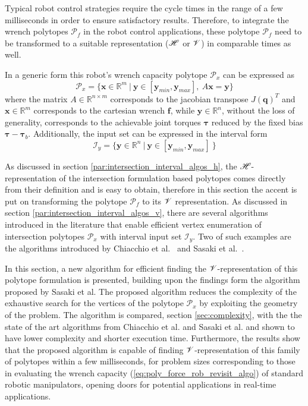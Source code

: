 Typical robot control strategies require the cycle times in the range of a few milliseconds in order to ensure satisfactory results. Therefore, to integrate the wrench polytopes $\mathcal{P}_f$ in the robot control applications, these polytope $\mathcal{P}_f$ need to be transformed to a suitable representation ($\mathscr{H}$ or $\mathscr{V}$) in comparable times as well.


In a generic form this robot's wrench capacity polytope $\mathcal{P}_x$ can be expressed as
\begin{equation}
    \mathcal{P}_x=\{\bm{x}\in\mathbb{R}^m~ |~\bm{y}\in[\bm{y}_{min}, \bm{y}_{max}], ~ A\bm{x} = \bm{y}\}
    \label{eq:inter_hyp_revisit_algo}
\end{equation}
where the matrix $A\in\mathbb{R}^{n\times m}$ corresponds to the jacobian transpose $J(\bm{q})^T$ and $\bm{x}\in\mathbb{R}^m$ corresponds to the cartesian wrench $\bm{f}$, while $\bm{y}\in\mathbb{R}^n$, without the loss of generality, corresponds to the achievable joint torques $\bm{\tau}$ reduced by the fixed bias $\bm{\tau} - \bm{\tau}_b$.  Additionally, the input set can be expressed in the interval form
\begin{equation}
    \mathcal{I}_y=\{\bm{y}\in\mathbb{R}^n~ |~\bm{y}\in[\bm{y}_{min}, \bm{y}_{max}]~\}
    \label{eq:interval_revisit_algo}
\end{equation}

As discussed in section \ref{par:intersection_interval_algos_h}, the $\mathscr{H}$-representation of the intersection formulation based polytopes comes directly from their definition and is easy to obtain, therefore in this section the accent is put on transforming the polytope $\mathcal{P}_f$ to its $\mathscr{V}$ representation. As discussed in section \ref{par:intersection_interval_algos_v}, there are several algorithms introduced in the literature that enable efficient vertex enumeration of intersection polytopes $\mathcal{P}_x$  with interval input set $\mathcal{I}_y$. Two of such examples are the algorithms introduced by Chiacchio et al.~\cite{chiacchio_evaluation_1996} and Sasaki et al.~\cite{sasaki2011vertex}.

In this section, a new algorithm for efficient finding the $\mathscr{V}$-representation of this polytope formulation is presented, building upon the findings form the algorithm proposed by Sasaki et al. The proposed algorithm reduces the complexity of the exhaustive search for the vertices of the polytope $\mathcal{P}_x$ by exploiting the geometry of the problem. The algorithm is compared, section \ref{sec:complexity}, with the the state of the art algorithms from Chiacchio et al. and Sasaki et al. and shown to have lower complexity and shorter execution time. Furthermore, the results show that the proposed algorithm is capable of finding $\mathscr{V}$-representation of this family of polytopes within a few milliseconds, for problem sizes corresponding to those in evaluating the wrench capacity (\ref{eq:poly_force_rob_revisit_algo}) of standard robotic manipulators, opening doors for potential applications in real-time applications.


